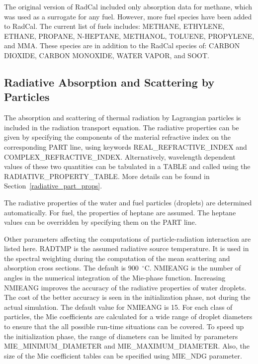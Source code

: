 \documentclass[11pt]{book}
\begin{document}
\label{info:RadCal_fuelspecies}

The original version of RadCal included only absorption data for methane, which was used as a surrogate for any fuel. However, more fuel species have been added to RadCal. The current list of fuels includes: {\ct METHANE}, {\ct ETHYLENE}, {\ct ETHANE}, {\ct PROPANE}, {\ct N-HEPTANE}, {\ct METHANOL}, {\ct TOLUENE}, {\ct PROPYLENE}, and {\ct MMA}. These species are in addition to the RadCal species of: {\ct CARBON DIOXIDE}, {\ct CARBON MONOXIDE}, {\ct WATER VAPOR}, and {\ct SOOT}.



\subsection{Radiative Absorption and Scattering by Particles}

\label{info:RADI_Absorption}

The absorption and scattering of thermal radiation by Lagrangian particles is included in the radiation transport equation. The radiative properties can be given by specifying the components of the material refractive index on the corresponding {\ct PART} line, using keywords {\ct REAL\_REFRACTIVE\_INDEX} and {\ct COMPLEX\_REFRACTIVE\_INDEX}. Alternatively, wavelength dependent values of these two quantities can be tabulated in a {\ct TABLE} and called using the {\ct RADIATIVE\_PROPERTY\_TABLE}. More details can be found in Section~\ref{radiative_part_props}.

The radiative properties of the water and fuel particles (droplets) are determined automatically. For fuel, the properties of heptane are assumed. The heptane values can be overridden by specifying them on the {\ct PART} line.

Other parameters affecting the computations of particle-radiation interaction are listed here. {\ct RADTMP} is the assumed radiative source temperature. It is used in the spectral weighting during the computation of the mean scattering and absorption cross sections. The default is 900~$^\circ$C. {\ct NMIEANG} is the number of angles in the numerical integration of the Mie-phase function. Increasing {\ct NMIEANG} improves the accuracy of the radiative properties of water droplets. The cost of the better accuracy is seen in the initialization phase, not during the actual simulation. The default value for {\ct NMIEANG} is 15. For each class of particles, the Mie coefficients are calculated for a wide range of droplet diameters to ensure that the all possible run-time situations can be covered. To speed up the initialization phase, the range of diameters can be limited by parameters {\ct MIE\_MINIMUM\_DIAMETER} and {\ct MIE\_MAXIMUM\_DIAMETER}. Also, the size of the Mie coefficient tables can be specified using {\ct MIE\_NDG} parameter.
\end{document}
